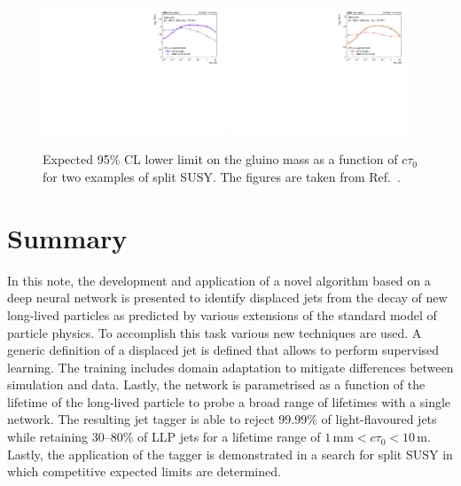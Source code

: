 \documentclass{webofc}
\newcommand{\ctau}{\ensuremath{c\tau_{0}}\xspace}
\begin{document}
\begin{figure}[!ht]
\includegraphics[width=0.48\textwidth]{figs/summaryU.pdf}\hspace{0.03\textwidth}
\includegraphics[width=0.48\textwidth]{figs/summaryC.pdf}
\centering
\caption{\label{fig:limits}Expected 95\% CL lower limit on the gluino mass as a function of \ctau for two examples of split SUSY. The figures are taken from Ref.~\cite{CMS-EXO-19-011}.}
\label{fig-4}
\end{figure}

\section{Summary}
\label{Summary}

In this note, the development and application of a novel algorithm based on a deep neural network is presented to identify displaced jets from the decay of new long-lived particles as predicted by various extensions of the standard model of particle physics. To accomplish this task various new techniques are used. A generic definition of a displaced jet is defined that allows to perform supervised learning. The training includes domain adaptation to mitigate differences between simulation and data. Lastly, the network is parametrised as a function of the lifetime of the long-lived particle to probe a broad range of lifetimes with a single network. The resulting jet tagger is able to reject 99.99\% of light-flavoured jets while retaining 30--80\% of LLP jets for a lifetime range of $1\,\textrm{mm}<\ctau<10\,\textrm{m}$. Lastly, the application of the tagger is demonstrated in a search for split SUSY in which competitive expected limits are determined.
\end{document}
